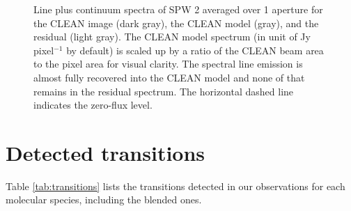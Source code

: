 \documentclass[twocolumn, twocolappendix, astrosymb, times]{aastex631}
\begin{document}
\begin{figure*}
\caption{Line plus continuum spectra of SPW 2 averaged over 1 aperture for the CLEAN image (dark gray), the CLEAN model (gray), and the residual (light gray). The CLEAN model spectrum (in unit of Jy pixel$^{-1}$ by default) is scaled up by a ratio of the CLEAN beam area to the pixel area for visual clarity. The spectral line emission is almost fully recovered into the CLEAN model and none of that remains in the residual spectrum. The horizontal dashed line indicates the zero-flux level.}
\label{fig:JvM_spectrum}
\end{figure*}


\section{Detected transitions}\label{appendix:transitions}
Table \ref{tab:transitions} lists the transitions detected in our observations for each molecular species, including the blended ones.
\end{document}
